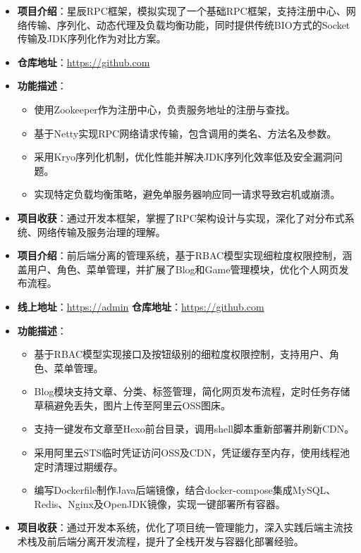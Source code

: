 \documentclass{../../styles/resume}
\begin{document}
\begin{itemize}[leftmargin=*, labelsep=0.5em]
  \item \textbf{项目介绍}：星辰RPC框架，模拟实现了一个基础RPC框架，支持注册中心、网络传输、序列化、动态代理及负载均衡功能，同时提供传统BIO方式的Socket传输及JDK序列化作为对比方案。
  \item \textbf{仓库地址}：\url{https://github.com}
  \item \textbf{功能描述}：
    \begin{itemize}
      \item 使用Zookeeper作为注册中心，负责服务地址的注册与查找。
      \item 基于Netty实现RPC网络请求传输，包含调用的类名、方法名及参数。
      \item 采用Kryo序列化机制，优化性能并解决JDK序列化效率低及安全漏洞问题。
      \item 实现特定负载均衡策略，避免单服务器响应同一请求导致宕机或崩溃。
    \end{itemize}
  \item \textbf{项目收获}：通过开发本框架，掌握了RPC架构设计与实现，深化了对分布式系统、网络传输及服务治理的理解。
\end{itemize}
\begin{itemize}[leftmargin=*, labelsep=0.5em]
  \item \textbf{项目介绍}：前后端分离的管理系统，基于RBAC模型实现细粒度权限控制，涵盖用户、角色、菜单管理，并扩展了Blog和Game管理模块，优化个人网页发布流程。
  \item \textbf{线上地址}：\url{https://admin} \quad \textbf{仓库地址}：\url{https://github.com}
  \item \textbf{功能描述}：
    \begin{itemize}
      \item 基于RBAC模型实现接口及按钮级别的细粒度权限控制，支持用户、角色、菜单管理。
      \item Blog模块支持文章、分类、标签管理，简化网页发布流程，定时任务存储草稿避免丢失，图片上传至阿里云OSS图床。
      \item 支持一键发布文章至Hexo前台目录，调用shell脚本重新部署并刷新CDN。
      \item 采用阿里云STS临时凭证访问OSS及CDN，凭证缓存至内存，使用线程池定时清理过期缓存。
      \item 编写Dockerfile制作Java后端镜像，结合docker-compose集成MySQL、Redis、Nginx及OpenJDK镜像，实现一键部署所有容器。
    \end{itemize}
  \item \textbf{项目收获}：通过开发本系统，优化了项目统一管理能力，深入实践后端主流技术栈及前后端分离开发流程，提升了全栈开发与容器化部署经验。
\end{itemize}
\end{document}
